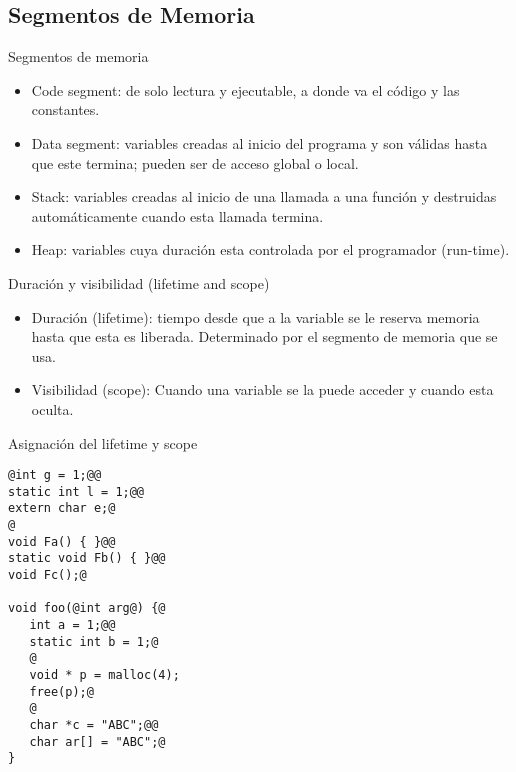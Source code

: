 \subsection{Segmentos de Memoria}
\begin{frame}[fragile,label=SM]{Segmentos de memoria}
   \begin{itemize}
      \item<1-> Code segment: de solo lectura y ejecutable, a donde va el c\'odigo y las constantes.
      \item<2-> Data segment: variables creadas al inicio del programa y son v\'alidas hasta que este termina; pueden ser de acceso global o local.
      \item<3-> Stack: variables creadas al inicio de una llamada a una funci\'on y destruidas autom\'aticamente cuando esta llamada termina.
      \item<4-> Heap: variables cuya duraci\'on esta controlada por el programador (run-time).
   \end{itemize}
\end{frame}
\begin{frame}[fragile,label=LS]{Duraci\'on y visibilidad (lifetime and scope)}
   \begin{itemize}
       \item<1-> Duraci\'on (lifetime): tiempo desde que a la variable se le reserva memoria hasta que esta es liberada. Determinado por el segmento de memoria que se usa.
       \item<2-> Visibilidad (scope): Cuando una variable se la puede acceder y cuando esta oculta.
   \end{itemize}
\end{frame}
\begin{frame}[fragile]{Asignaci\'on del lifetime y scope}
         \begin{lstlisting}[style=dimmided]
@int g = 1;@@
static int l = 1;@@
extern char e;@
@
void Fa() { }@@
static void Fb() { }@@
void Fc();@

void foo(@int arg@) {@
   int a = 1;@@
   static int b = 1;@
   @
   void * p = malloc(4);
   free(p);@
   @
   char *c = "ABC";@@
   char ar[] = "ABC";@
}
         \end{lstlisting}
\end{frame}

